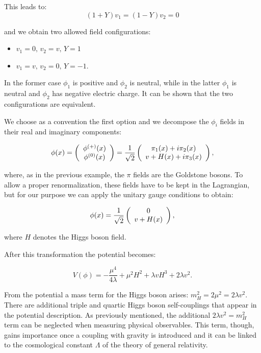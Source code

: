This leads to:
\begin{equation}
(1+Y)v_1 = (1-Y)v_2 = 0
\end{equation}

and we obtain two allowed field configurations:

\begin{itemize}
\item $v_1 = 0, \, v_2 = v, \, Y = 1$
\item $v_1 = v, \, v_2 = 0, \, Y = -1$.
\end{itemize}

In the former case $\phi_1$ is positive and $\phi_2$ is neutral, while in the latter $\phi_1$ is neutral and $\phi_2$ has negative electric charge. It can be shown that the two configurations are equivalent. %

We choose as a convention the first option and we decompose the $\phi_i$ fields in their real and imaginary components:

\begin{equation}
\phi(x) = \left(\begin{array}{c}\phi^{(+)}(x) \\\phi^{(0)}(x)\end{array}\right) = \dfrac{1}{\sqrt{2}} \left(\begin{array}{c} \pi_1(x) + i \pi_2(x)  \\ v + H(x) + i \pi_3(x) \end{array}\right),
\end{equation}

where, as in the previous example, the $\pi$ fields are the Goldstone bosons.  To allow a proper renormalization, these fields have to be kept in the Lagrangian, but for our purpose we can apply the unitary gauge conditions to obtain:

\begin{equation}
\phi(x) = \dfrac{1}{\sqrt{2}} \left(\begin{array}{c} 0  \\ v + H(x) \end{array}\right),
\end{equation}

where $H$ denotes the Higgs boson field.

After this transformation the potential becomes:

\begin{equation}
V(\phi) = -\dfrac{\mu^4}{4\lambda} + \mu^2H^2 + \lambda v H^3 + 2 \lambda v^2.
\end{equation}

From the potential a mass term for the Higgs boson arises: $m^{2}_H = 2\mu^2 = 2 \lambda v^2$. There are additional triple and quartic Higgs boson self-couplings that appear in the potential description. As previously mentioned, the additional $2 \lambda v^2 = m^{2}_H$ term can be neglected when measuring physical observables. This term, though, gains importance once a coupling with gravity is introduced and it can be linked to the cosmological constant $\Lambda$ of the theory of general relativity.

